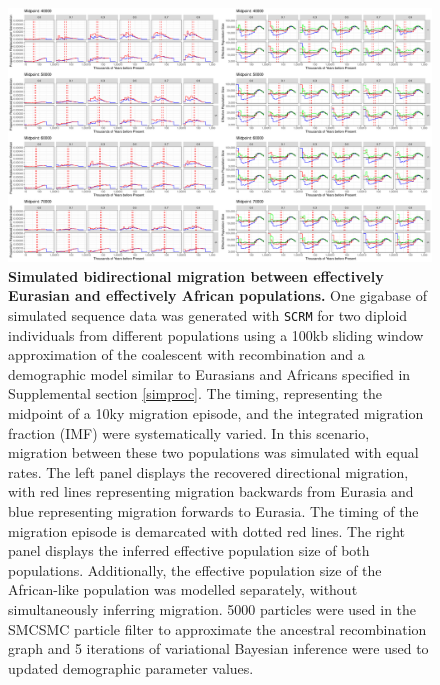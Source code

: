 \begin{figure}
	\centering
	\includegraphics[width=\textwidth]{plot/bidirectional_different_starts.pdf}
	\caption[Simulated bidirectional migration between effectively Eurasian and effectively African populations]{{\bf Simulated bidirectional migration between effectively Eurasian and effectively African populations.} One gigabase of simulated sequence data was generated with {\tt SCRM} for two diploid individuals from different populations using a 100kb sliding window approximation of the coalescent with recombination and a demographic model similar to Eurasians and Africans specified in Supplemental section \ref{simproc}. The timing, representing the midpoint of a 10ky migration episode, and the integrated migration fraction (IMF) were systematically varied. In this scenario, migration between these two populations was simulated with equal rates. The left panel displays the recovered directional migration, with red lines representing migration backwards from Eurasia and blue representing migration forwards to Eurasia. The timing of the migration episode is demarcated with dotted red lines. The right panel displays the inferred effective population size of both populations. Additionally, the effective population size of the African-like population was modelled separately, without simultaneously inferring migration. 5000 particles were used in the SMCSMC particle filter to approximate the ancestral recombination graph and 5 iterations of variational Bayesian inference were used to updated demographic parameter values.}
	\label{fig:bisim}
\end{figure}


